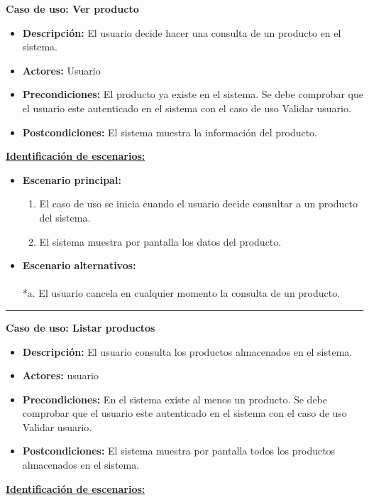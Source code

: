 \textbf{Caso de uso: Ver producto}
\begin{itemize}\renewcommand{\labelitemi}{$\cdot$}
 \item \textbf{Descripción:} El usuario decide hacer una consulta de un producto en el sistema.
  \item \textbf{Actores:} Usuario
  \item \textbf{Precondiciones:} El producto ya existe en el sistema. Se debe comprobar que el usuario este autenticado en el sistema con el caso de uso Validar usuario.
  \item \textbf{Postcondiciones:} El sistema muestra la información del producto.
\end{itemize}
\underline{\textbf{Identificación de escenarios:}}
\begin{itemize}\renewcommand{\labelitemi}{$\circ$}
 \item \textbf{Escenario principal:}
         \begin{enumerate}
          \item El caso de uso se inicia cuando el usuario decide consultar a un producto del sistema.
	  \item El sistema muestra por pantalla los datos del producto.
         \end{enumerate}
  \item \textbf{Escenario alternativos:}\\\\
          *a. El usuario cancela en cualquier momento la consulta de un producto.
\end{itemize}
\smallskip
\hrule height 1pt
\smallskip
\textbf{Caso de uso: Listar productos}
\begin{itemize}\renewcommand{\labelitemi}{$\cdot$}
 \item \textbf{Descripción:} El usuario consulta los productos almacenados en el sistema.
  \item \textbf{Actores:} usuario
  \item \textbf{Precondiciones:} En el sistema existe al menos un producto. Se debe comprobar que el usuario este autenticado en el sistema con el caso de uso Validar usuario.
  \item \textbf{Postcondiciones:} El sistema muestra por pantalla todos los productos almacenados en el sistema.
\end{itemize}
\underline{\textbf{Identificación de escenarios:}}
